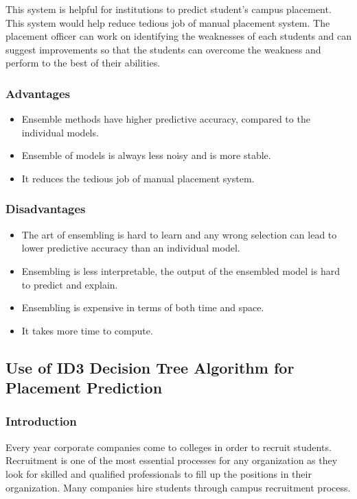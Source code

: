 \documentclass[12pt]{article}
\begin{document}
This system is helpful for institutions to predict
student’s campus placement. This system would help reduce 
tedious job of manual placement system. The placement 
officer can work on identifying the weaknesses of each 
students and can suggest improvements so that the students 
can overcome the weakness and perform to the best of their 
abilities.

\newpage
\subsubsection{Advantages}
\begin{itemize}
\item Ensemble methods have higher predictive accuracy, compared to the individual models.
\item Ensemble of models is always less noisy and is more stable. 
\item It reduces the tedious job of manual placement system. 
\end{itemize}
\vspace{10px}
\par \subsubsection{Disadvantages}
\begin{itemize}
\item The art of ensembling is hard to learn and any wrong selection can lead to lower predictive accuracy than an individual model.
\item Ensembling is less interpretable, the output of the ensembled model is hard to predict and explain.
\item Ensembling is expensive in terms of both time and space.
\item It takes more time to compute.
\end{itemize}
\vspace{10px}
\newpage

\subsection{Use of ID3 Decision Tree Algorithm for Placement Prediction}
\vspace*{10px}

\subsubsection{Introduction}
Every year corporate companies come to 
colleges in order to recruit students. Recruitment is one of the 
most essential processes for any organization as they look for 
skilled and qualified professionals to fill up the positions in 
their organization. Many companies hire students through 
campus recruitment process. 
\end{document}
